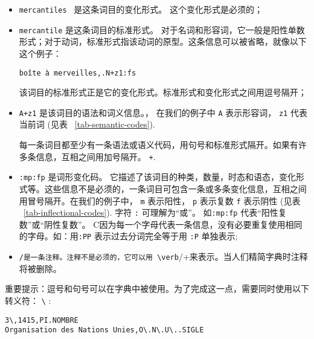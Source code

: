 \bigskip
\begin{itemize}
\item \verb+mercantiles + 是这条词目的变化形式。 这个变化形式是必须的；
  
\bigskip \item \verb+mercantile+ 是这条词目的标准形式。
 对于名词和形容词，它一般是阳性单数形式；对于动词，标准形式指该动词的原型。这条信息可以被省略，就像以下这个例子：

  
\bigskip
\verb$boîte à merveilles,.N+z1:fs$
  
\bigskip 该词目的标准形式正是它的变化形式。标准形式和变化形式之间用逗号隔开；
\index{\verb+,+}
  
\bigskip \item \verb$A+z1$ 是该词目的语法和词义信息。，
 在我们的例子中 \verb+A+
表示形容词， \verb+z1+ 代表当前词 (见表 ~\ref{tab-semantic-codes}).

每一条词目都至少有一条语法或语义代码，用句号和标准形式隔开。如果有许多条信息，互相之间用加号隔开。 \verb$+$\index{\verb$+$}.
  
\bigskip
\item \verb+:mp:fp+ 是词形变化码。
 它描述了该词目的种类，数量，时态和语态，变化形式等。这些信息不是必须的，一条词目可包含一条或多条变化信息，互相之间用冒号隔开。在我们的例子中， \verb+m+ 表示阳性，
\verb+p+ 表示复数 \verb+f+ 表示阴性 (见表 ~\ref{tab-inflectional-codes}). 字符 \verb+:+ 可理解为“或”。 如\verb+:mp:fp+ 代表“阳性复数”或“阴性复数”。 C因为每一个字母代表一条信息，没有必要重复使用相同的字母。如：用\verb+:PP+ 表示过去分词完全等于用 \verb+:P+ 单独表示;\index{\verb+:+}
  
\bigskip \item \verb+/是一条注释。注释不是必须的，它可以用 \verb+/+来表示。当人们精简字典时注释将被删除。 \index{\verb+/+}
\end{itemize}

\bigskip
\noindent 重要提示：逗号和句号可以在字典中被使用。为了完成这一点，需要同时使用以下转义符：
\verb+\+ \index{\verb+\,+}\index{\verb+\.+}\index{\verb+\+}:

\bigskip
\begin{verbatim}
3\,1415,PI.NOMBRE
Organisation des Nations Unies,O\.N\.U\..SIGLE
\end{verbatim}


